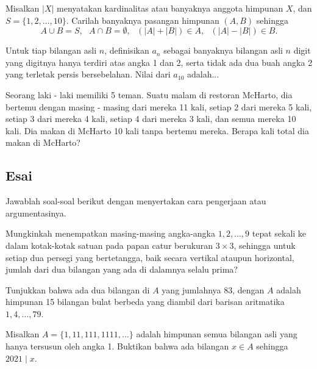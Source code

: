 \documentclass[11pt]{scrartcl}
\begin{document}
	\begin{soalbaru}
		Misalkan $|X|$ menyatakan kardinalitas atau banyaknya anggota himpunan $X$, dan $S=\{1,2,\dots,10\}$. Carilah banyaknya pasangan himpunan $(A,B)$ sehingga\\[-20pt]
		$$A \cup B = S,\text{ } A \cap B = \emptyset, \text{ } (|A|+|B|) \in A,\text{ } (|A|-|B|) \in B. $$ %
	\end{soalbaru}
	\begin{soalbaru}
		Untuk tiap bilangan asli $n$, definisikan $a_n$ sebagai banyaknya bilangan asli $n$
			digit yang digitnya hanya terdiri atas angka 1 dan 2, serta tidak ada
			dua buah angka 2 yang terletak persis bersebelahan. Nilai dari $a_{10}$ adalah...
		\end{soalbaru}

	\begin{soalbaru}
		Seorang laki - laki memiliki 5 teman. Suatu malam di restoran McHarto, dia bertemu
		dengan masing - masing dari mereka 11 kali, setiap 2 dari mereka 5 kali, setiap 3 dari mereka 4 kali, setiap 4 dari mereka 3 kali, dan semua mereka 10 kali. Dia makan di McHarto 10 kali tanpa bertemu mereka. Berapa kali total dia makan di McHarto?
	\end{soalbaru}

\subsection{Esai}
Jawablah soal-soal berikut dengan menyertakan cara pengerjaan atau argumentasinya.
	
	\begin{soalbaru} 
		Mungkinkah menempatkan masing-masing angka-angka $1,2,\dots,9$ tepat sekali ke dalam kotak-kotak satuan pada papan catur berukuran $3\times 3$, sehingga untuk setiap dua persegi yang bertetangga, baik secara vertikal ataupun horizontal, jumlah dari dua bilangan yang ada di dalamnya selalu prima?
	\end{soalbaru}
	
	\begin{soalbaru} 
		 Tunjukkan bahwa ada dua bilangan di $A$ yang jumlahnya 83, dengan $A$ adalah himpunan 15 bilangan bulat berbeda yang diambil dari barisan aritmatika $1,4,\dots,79$.
	\end{soalbaru}
	
	\begin{soalbaru} 
		Misalkan $A = \{1,11,111,1111,\dots\}$ adalah himpunan semua bilangan asli yang hanya tersusun oleh angka 1. Buktikan bahwa ada bilangan $x \in A$ sehingga $2021 \mid x$.
	\end{soalbaru}
	
\end{document}
